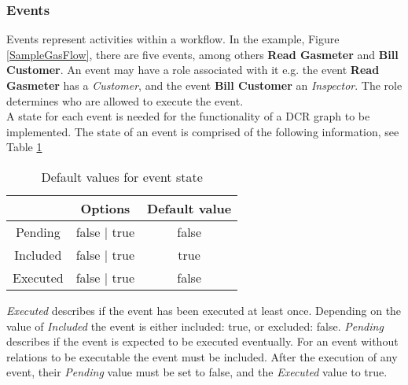 \subsubsection{Events}
Events represent activities within a workflow. In the example, Figure \ref{SampleGasFlow}, there are five events, among others \textbf{Read Gasmeter} and \textbf{Bill Customer}. An event may have a role associated with it e.g. the event \textbf{Read Gasmeter} has a \textit{Customer}, and the event \textbf{Bill Customer} an \textit{Inspector}. The role determines who are allowed to execute the event. \\

A state for each event is needed for the functionality of a DCR graph to be implemented. The state of an event is comprised of the following information, see Table \ref{tab:TableOFDefaultValues} \\
\begin{table}[h!]
\centering
\begin{tabular}{|c|c|c|}\hline 
 & Options & Default value \\ \hline 
Pending & false $\vert$ true & false \\ \hline 
Included & false $\vert$ true & true \\ \hline
Executed & false $\vert$ true & false \\ \hline

\end{tabular} 
\caption{\label{tab:TableOFDefaultValues} Default values for event state}
\end{table}

\textit{Executed} describes if the event has been executed at least once. Depending on the value of \textit{Included} the event is either included: true, or excluded: false. \textit{Pending} describes if the event is expected to be executed eventually. For an event without relations to be executable the event must be included. After the execution of any event, their \textit{Pending} value must be set to false, and the \textit{Executed} value to true.